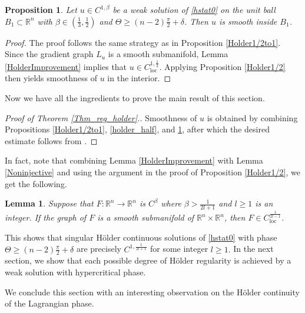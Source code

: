 \documentclass[12pt,reqno]{amsart}%
\theoremstyle{plain}
\newtheorem{lemma}[theorem]{Lemma}
\newtheorem{proposition}[theorem]{Proposition}
\numberwithin{equation}{section}
\theoremstyle{definition}
\theoremstyle{remark}
\newcommand{\R}{\mathbb{R}}
\begin{document}
\begin{proposition} \label{holder_third}
Let $u \in C^{1, \beta}$ be a weak solution of \eqref{hstat0}  on the unit ball $B_1\subset \mathbb{R}^n$  with $\beta \in ( \frac13 , \frac12)$ and  $\Theta \geq (n-2)\frac{\pi}{2}+\delta$. Then $u$ is smooth inside $B_1$.

\end{proposition} 

\begin{proof} The proof follows the same strategy as in Proposition \ref{Holder1/2to1}. Since the gradient graph $L_u$ is a smooth submanifold, Lemma \ref{HolderImprovement} implies that $u \in C^{1,\frac{1}{2}}_{\mathrm{loc}}$. Applying Proposition \ref{Holder1/2} then yields smoothness of $u$ in the interior.
\end{proof} 

Now we have all the ingredients to prove the main result of this section. 
\begin{proof}[Proof of Theorem \ref{Thm_reg_holder}.]
 Smoothness of $u$ is obtained by combining Propositions \ref{Holder1/2to1}, \ref{holder_half}, and \ref{holder_third}, after which the desired estimate follows from \cite[Theorem 1.2]{ChenWarren}.
\end{proof}



    
In fact, note that combining Lemma \ref{HolderImprovement} with Lemma \ref{Noninjective} and using the argument in the proof of Proposition \ref{Holder1/2}, we get the following. 

\begin{lemma} Suppose that $F : \R^n \to \R^n$ is $C^\beta $ where $\beta > \frac{ 1}{ 2l+ 1} $ and $l \geq 1$ is an integer. If the graph of $F$ is a smooth submanifold of $\R^n \times \R^n$, then $F \in C^{\frac{ 1} { 2l-1} }_{\mathrm{loc}}$. 
\end{lemma} 

This shows that singular H\"older continuous solutions of \eqref{hstat0} with phase $\Theta \geq  (n-2) \frac \pi 2  + \delta $ are precisely $C^{1,\frac 1 {2l+1}}$ for some integer $l \geq 1.$ In the next section, we show that each possible degree of H\"older regularity is achieved by a weak solution with hypercritical phase. 





We conclude this section with an interesting observation on the H\"older continuity of the Lagrangian phase.
\end{document}
